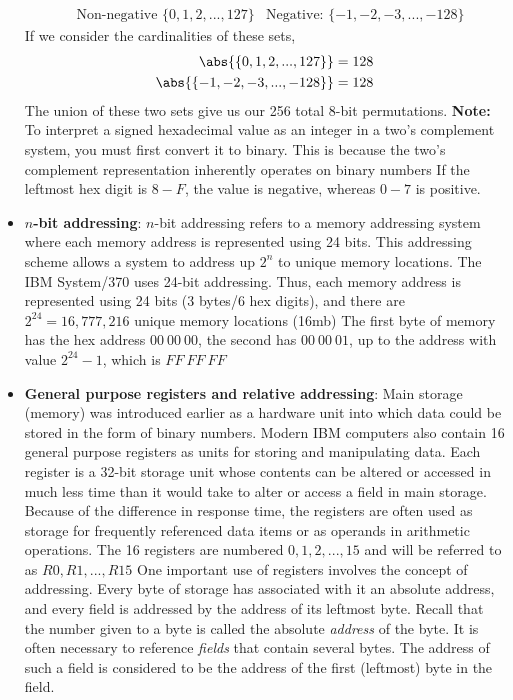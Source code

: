 \documentclass{report}
\begin{document}
\begin{itemize}
\begin{align*}
                &\text{Non-negative } \{0,1,2,...,127\}
                &\text{Negative: } \{-1,-2,-3,...,-128\}
            \end{align*}
            If we consider the cardinalities of these sets,
            \begin{align*}
                \abs{\{0,1,2,...,127\}} = 128 \\
                \abs{\{-1,-2,-3,...,-128\}} = 128
            \end{align*}
            The union of these two sets give us our 256 total 8-bit permutations.
            \bigbreak \noindent 
            \textbf{Note:} To interpret a signed hexadecimal value as an integer in a two's complement system, you must first convert it to binary. This is because the two's complement representation inherently operates on binary numbers
            \bigbreak \noindent 
            If the leftmost hex digit is $8-F$, the value is negative, whereas $0-7$  is positive.
        \item \textbf{$n$-bit addressing}: $n$-bit addressing refers to a memory addressing system where each memory address is represented using 24 bits. This addressing scheme allows a system to address up $2^{n}$ to unique memory locations.
            \bigbreak \noindent 
            The IBM System/370 uses 24-bit addressing. Thus, each memory address is represented using 24 bits (3 bytes/6 hex digits), and there are $2^{24} = 16,777,216$ unique memory locations (16mb)
            \bigbreak \noindent 
            The first byte of memory has the hex address $00 \ 00 \ 00$, the second has $00 \ 00 \ 01$, up to the address with value $2^{24}-1 $, which is $FF \ FF \ FF $
        \item \textbf{General purpose registers and relative addressing}: Main storage (memory) was introduced earlier as a hardware unit into which data could be stored in the form of binary numbers. Modern IBM computers also contain 16 general purpose registers as units for storing and manipulating data. Each register is a 32-bit storage unit whose contents can be altered or accessed in much less time than it would take to alter or access a field in main storage. Because of the difference in response time, the registers are often used as storage for frequently referenced data items or as operands in arithmetic operations.
            \bigbreak \noindent 
            The 16 registers are numbered $0,1,2,...,15$ and will be referred to as $R0, R1, ...,R15 $
            \bigbreak \noindent 
            One important use of registers involves the concept of addressing. Every byte of storage has associated with it an absolute address, and every field is addressed by the address of its leftmost byte. Recall that  the number given to a byte is called the absolute \textit{address} of the byte. It is often necessary to reference \textit{fields} that contain several bytes. The address of such a field is considered to be the address of the first (leftmost) byte in the field.

\end{itemize}
\end{document}
